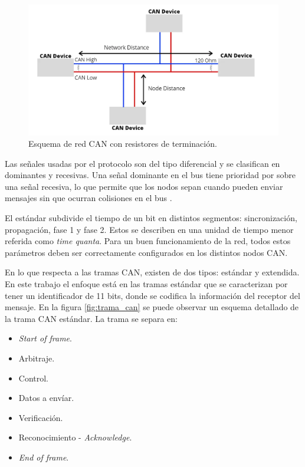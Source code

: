 \begin{figure}[h!]
	\centering
	\includegraphics[scale=0.55]{./Figures/canBus.png}
	\caption{Esquema de red CAN con resistores de terminación\protect\footnotemark .}
	\label{fig:red_can_con_resistores}
\end{figure}


Las señales usadas por el protocolo son del tipo diferencial y se clasifican en dominantes y recesivas. Una señal dominante en el bus tiene prioridad por sobre una señal recesiva, lo que permite que los nodos sepan cuando pueden enviar mensajes sin que ocurran colisiones en el bus \citep{Embedded_Networking_CAN}.

El estándar subdivide el tiempo de un bit en distintos segmentos: sincronización, propagación, fase 1 y fase 2. Estos se describen en una unidad de tiempo menor referida como \textit{time quanta}. Para un buen funcionamiento de la red, todos estos parámetros deben ser correctamente configurados en los distintos nodos CAN.

En lo que respecta a las tramas CAN, existen de dos tipos: estándar y extendida. En este trabajo el enfoque está en las tramas estándar que se caracterizan por tener un identificador de 11 bits, donde se codifica la información del receptor del mensaje. En la figura \ref{fig:trama_can} \citep{can_trama_web} se puede observar un esquema detallado de la trama CAN estándar. La trama se separa en:

\begin{itemize}
	\item \textit{Start of frame}.
	\item Arbitraje.
	\item Control.
	\item Datos a envíar.
	\item Verificación.
	\item Reconocimiento - \textit{Acknowledge}.
	\item \textit{End of frame}.
\end{itemize} 

